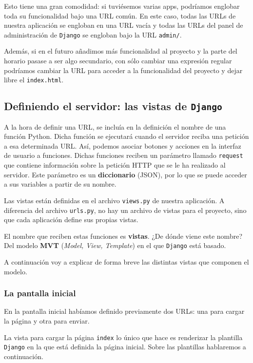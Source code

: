 Esto tiene una gran comodidad: si tuviésemos varias apps, podríamos englobar toda su funcionalidad bajo una URL común. En este caso, todas las URLs de nuestra aplicación se engloban en una URL vacía y todas las URLs del panel de administración de \texttt{Django} se engloban bajo la URL \texttt{admin/}. 

Además, si en el futuro añadimos más funcionalidad al proyecto y la parte del horario pasase a ser algo secundario, con sólo cambiar una expresión regular podríamos cambiar la URL para acceder a la funcionalidad del proyecto y dejar libre el \texttt{index.html}.

\subsection{Definiendo el servidor: las vistas de \texttt{Django}}
A la hora de definir una URL, se incluía en la definición el nombre de una función Python. Dicha función se ejecutará cuando el servidor reciba una petición a esa determinada URL. Así, podemos asociar botones y acciones en la interfaz de usuario a funciones. Dichas funciones reciben un parámetro llamado \texttt{request} que contiene información sobre la petición HTTP que se le ha realizado al servidor. Este parámetro es un \textbf{diccionario} (JSON), por lo que se puede acceder a sus variables a partir de su nombre.

Las vistas están definidas en el archivo \texttt{views.py} de nuestra aplicación. A diferencia del archivo \texttt{urls.py}, no hay un archivo de vistas para el proyecto, sino que cada aplicación define sus propias vistas.

El nombre que reciben estas funciones es \textbf{vistas}. ¿De dónde viene este nombre? Del modelo \textbf{MVT} (\textit{Model, View, Template}) en el que \texttt{Django} está basado.

A continuación voy a explicar de forma breve las distintas vistas que componen el modelo.

\subsubsection{La pantalla inicial}
En la pantalla inicial habíamos definido previamente dos URLs: una para cargar la página y otra para enviar.

La vista para cargar la página \texttt{index} lo único que hace es renderizar la plantilla \texttt{Django} en la que está definida la página inicial. Sobre las plantillas hablaremos a continuación.

